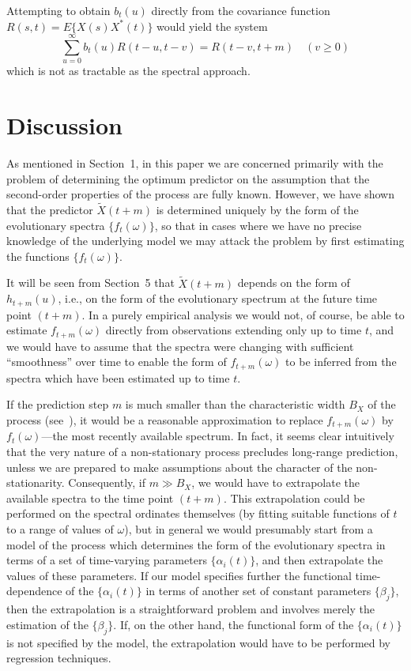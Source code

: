 \documentclass[11pt]{article}
\begin{document}
Attempting to obtain $b_t(u)$ directly from the covariance function $R(s,t) = E\{X(s) X^*(t)\}$ would yield the system
\begin{equation}
\sum_{u=0}^{\infty} b_t(u) R(t-u, t-v) = R(t-v, t+m) \quad (v \geq 0)
\label{eq:covariance-integral}
\end{equation}
which is not as tractable as the spectral approach.

\section{Discussion}\label{sec:discussion}

As mentioned in Section~1, in this paper we are concerned primarily with the problem of determining the optimum predictor on the assumption that the second-order properties of the process are fully known. However, we have shown that the predictor $\tilde{X}(t+m)$ is determined uniquely by the form of the evolutionary spectra $\{f_t(\omega)\}$, so that in cases where we have no precise knowledge of the underlying model we may attack the problem by first estimating the functions $\{f_t(\omega)\}$.

It will be seen from Section~5 that $\tilde{X}(t+m)$ depends on the form of $h_{t+m}(u)$, i.e., on the form of the evolutionary spectrum at the future time point $(t+m)$. In a purely empirical analysis we would not, of course, be able to estimate $f_{t+m}(\omega)$ directly from observations extending only up to time $t$, and we would have to assume that the spectra were changing with sufficient ``smoothness'' over time to enable the form of $f_{t+m}(\omega)$ to be inferred from the spectra which have been estimated up to time $t$.

If the prediction step $m$ is much smaller than the characteristic width $B_X$ of the process (see~\cite{Priestley1965}), it would be a reasonable approximation to replace $f_{t+m}(\omega)$ by $f_t(\omega)$---the most recently available spectrum. In fact, it seems clear intuitively that the very nature of a non-stationary process precludes long-range prediction, unless we are prepared to make assumptions about the character of the non-stationarity. Consequently, if $m \gg B_X$, we would have to extrapolate the available spectra to the time point $(t+m)$. This extrapolation could be performed on the spectral ordinates themselves (by fitting suitable functions of $t$ to a range of values of $\omega$), but in general we would presumably start from a model of the process which determines the form of the evolutionary spectra in terms of a set of time-varying parameters $\{\alpha_i(t)\}$, and then extrapolate the values of these parameters. If our model specifies further the functional time-dependence of the $\{\alpha_i(t)\}$ in terms of another set of constant parameters $\{\beta_j\}$, then the extrapolation is a straightforward problem and involves merely the estimation of the $\{\beta_j\}$. If, on the other hand, the functional form of the $\{\alpha_i(t)\}$ is not specified by the model, the extrapolation would have to be performed by regression techniques.
\end{document}
